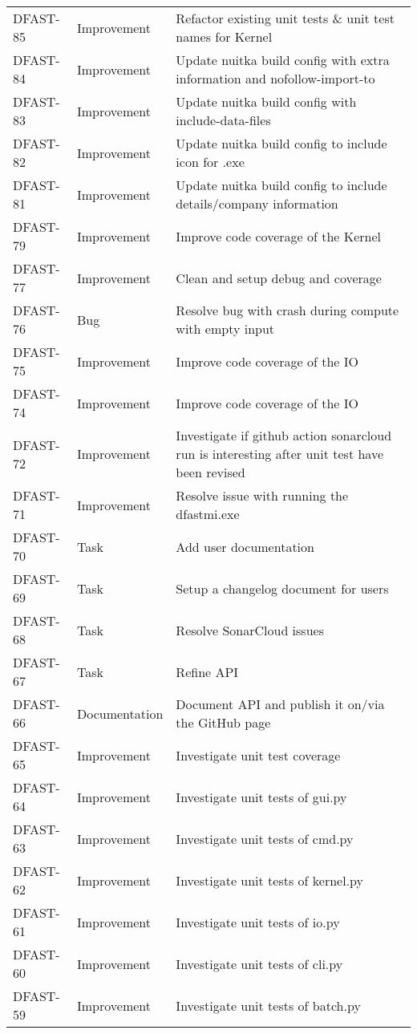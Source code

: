 \documentclass[git]{deltares_manual}
\begin{document}
\begin{longtable}{l|l|p{8cm}}
DFAST-85 & Improvement & Refactor existing unit tests \& unit test names for Kernel \\
DFAST-84 & Improvement & Update nuitka build config with extra information and nofollow-import-to \\
DFAST-83 & Improvement & Update nuitka build config with include-data-files \\
DFAST-82 & Improvement & Update nuitka build config to include icon for .exe \\
DFAST-81 & Improvement & Update nuitka build config to include details/company information \\
DFAST-79 & Improvement & Improve code coverage of the Kernel  \\
DFAST-77 & Improvement & Clean and setup debug and coverage \\
DFAST-76 & Bug & Resolve bug with crash during compute with empty input \\
DFAST-75 & Improvement & Improve code coverage of the IO \\
DFAST-74 & Improvement & Improve code coverage of the IO  \\
DFAST-72 & Improvement & Investigate if github action sonarcloud run is interesting after unit test have been revised \\
DFAST-71 & Improvement & Resolve issue with running the dfastmi.exe \\
DFAST-70 & Task & Add user documentation \\
DFAST-69 & Task & Setup a changelog document for users \\
DFAST-68 & Task & Resolve SonarCloud issues \\
DFAST-67 & Task & Refine API \\
DFAST-66 & Documentation & Document API and publish it on/via the GitHub page \\
DFAST-65 & Improvement & Investigate unit test coverage \\
DFAST-64 & Improvement & Investigate unit tests of gui.py \\
DFAST-63 & Improvement & Investigate unit tests of cmd.py \\
DFAST-62 & Improvement & Investigate unit tests of kernel.py \\
DFAST-61 & Improvement & Investigate unit tests of io.py \\
DFAST-60 & Improvement &  Investigate unit tests of cli.py \\
DFAST-59 & Improvement & Investigate unit tests of batch.py \\

\end{longtable}
\end{document}
